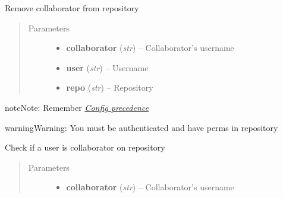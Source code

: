 \documentclass[letterpaper,10pt,english]{sphinxmanual}
\begin{document}
\begin{fulllineitems}
\begin{fulllineitems}
\end{fulllineitems}


\begin{fulllineitems}
\label{repos:pygithub3.services.repos.Collaborators.delete}
Remove collaborator from repository
\begin{quote}\begin{description}
\item[{Parameters}] \leavevmode\begin{itemize}
\item {} 
\textbf{collaborator} (\emph{str}) -- Collaborator's username

\item {} 
\textbf{user} (\emph{str}) -- Username

\item {} 
\textbf{repo} (\emph{str}) -- Repository

\end{itemize}

\end{description}\end{quote}

\begin{notice}{note}{Note:}
Remember {\hyperref[repos:config-precedence]{\emph{Config precedence}}}
\end{notice}

\begin{notice}{warning}{Warning:}
You must be authenticated and have perms in repository
\end{notice}

\end{fulllineitems}


\begin{fulllineitems}
\label{repos:pygithub3.services.repos.Collaborators.is_collaborator}
Check if a user is collaborator on repository
\begin{quote}\begin{description}
\item[{Parameters}] \leavevmode\begin{itemize}
\item {} 
\textbf{collaborator} (\emph{str}) -- Collaborator's username


\end{itemize}
\end{description}
\end{quote}
\end{fulllineitems}
\end{fulllineitems}
\end{document}
